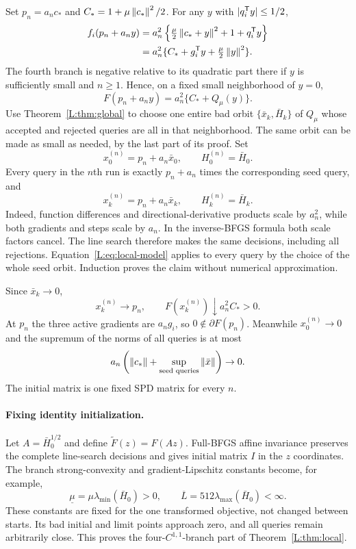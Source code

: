 Set $p_n=a_nc_*$ and $C_*=1+\mu\left\lVert c_*\right\rVert^2/2$. For any $y$ with $|q_i^{\mathsf T} y|\le1/2$,
\begin{align*}
 f_i(p_n+a_ny)
 &=a_n^2\left\{\tfrac\mu2\left\lVert c_*+y\right\rVert^2+1+q_i^{\mathsf T} y\right\}\\
 &=a_n^2\{C_*+g_i^{\mathsf T} y+\tfrac\mu2\left\lVert y\right\rVert^2\}.
\end{align*}
The fourth branch is negative relative to its quadratic part there if $y$ is sufficiently small and $n\ge1$. Hence, on a fixed small neighborhood of $y=0$,
\begin{equation}\label{L:eq:local-model}
 F(p_n+a_ny)=a_n^2\{C_*+Q_\mu(y)\}.
\end{equation}
Use Theorem~\ref{L:thm:global} to choose one entire bad orbit $\{\bar x_k,\bar H_k\}$ of $Q_\mu$ whose accepted and rejected queries are all in that neighborhood. The same orbit can be made as small as needed, by the last part of its proof. Set
\[
 x_0^{(n)}=p_n+a_n\bar x_0,\qquad H_0^{(n)}=\bar H_0.
\]
Every query in the $n$th run is exactly $p_n+a_n$ times the corresponding seed query, and
\[
 x_k^{(n)}=p_n+a_n\bar x_k,\qquad H_k^{(n)}=\bar H_k.
\]
Indeed, function differences and directional-derivative products scale by $a_n^2$, while both gradients and steps scale by $a_n$. In the inverse-BFGS formula both scale factors cancel. The line search therefore makes the same decisions, including all rejections. Equation~\eqref{L:eq:local-model} applies to every query by the choice of the whole seed orbit. Induction proves the claim without numerical approximation.

Since $\bar x_k\to0$,
\[
 x_k^{(n)}\to p_n,\qquad F(x_k^{(n)})\downarrow a_n^2C_*>0.
\]
At $p_n$ the three active gradients are $a_ng_i$, so $0\notin\partial F(p_n)$. Meanwhile $x_0^{(n)}\to0$ and the supremum of the norms of all queries is at most
\[
 a_n\left(\left\lVert c_*\right\rVert+\sup_{\text{seed queries}}\left\lVert\bar x\right\rVert\right)\to0.
\]
The initial matrix is one fixed SPD matrix for every $n$.

\paragraph{Fixing identity initialization.}
Let $A=\bar H_0^{1/2}$ and define $\widetilde F(z)=F(Az)$. Full-BFGS affine invariance preserves the complete line-search decisions and gives initial matrix $I$ in the $z$ coordinates. The branch strong-convexity and gradient-Lipschitz constants become, for example,
\[
 \underline\mu=\mu\lambda_{\min}(\bar H_0)>0,\qquad
 \overline L=512\lambda_{\max}(\bar H_0)<\infty.
\]
These constants are fixed for the one transformed objective, not changed between starts. Its bad initial and limit points approach zero, and all queries remain arbitrarily close. This proves the four-$C^{1,1}$-branch part of Theorem~\ref{L:thm:local}.


